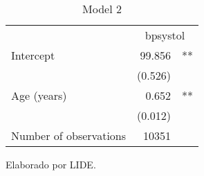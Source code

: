 \documentclass{article}
\begin{document}
\begin{table}[!h]
\caption{Model 2}
\centering
\begin{tabular}{lll}
\cline{1-3}
\multicolumn{1}{r}{} &
  \multicolumn{2}{c}{bpsystol} \\
\cline{1-3}
\multicolumn{1}{l}{Intercept} &
  \multicolumn{1}{r}{99.856} &
  \multicolumn{1}{l}{**} \\
\multicolumn{1}{l}{} &
  \multicolumn{1}{r}{(0.526)} &
  \multicolumn{1}{l}{} \\
\multicolumn{1}{l}{Age (years)} &
  \multicolumn{1}{r}{0.652} &
  \multicolumn{1}{l}{**} \\
\multicolumn{1}{l}{} &
  \multicolumn{1}{r}{(0.012)} &
  \multicolumn{1}{l}{} \\
\multicolumn{1}{l}{Number of observations} &
  \multicolumn{1}{r}{10351} &
  \multicolumn{1}{l}{} \\
\cline{1-3}
\end{tabular}

\footnotesize{
Elaborado por LIDE.
}
\end{table}
\end{document}
